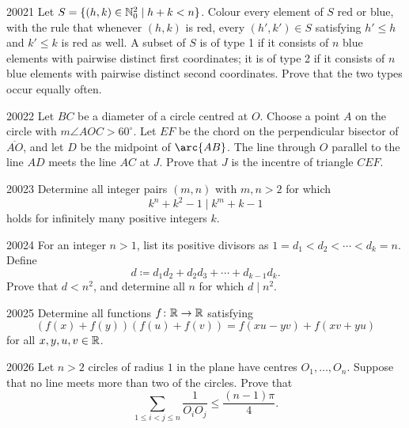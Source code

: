 
\begin{problem}{2002}{1}
Let $S=\{(h, k)\in\mathbb{N}_0^2\mid h+k<n\}$. Colour every element of $S$ red or blue, with the rule that whenever $(h, k)$ is red, every $(h', k')\in S$ satisfying $h'\leq h$ and $k'\leq k$ is red as well. A subset of $S$ is of type 1 if it consists of $n$ blue elements with pairwise distinct first coordinates; it is of type 2 if it consists of $n$ blue elements with pairwise distinct second coordinates. Prove that the two types occur equally often.
\end{problem}

\begin{problem}{2002}{2}
Let $BC$ be a diameter of a circle centred at $O$. Choose a point $A$ on the circle with $m\angle AOC>60^\circ$. Let $EF$ be the chord on the perpendicular bisector of $\overline{AO}$, and let $D$ be the midpoint of $\arc{AB}$. The line through $O$ parallel to the line $AD$ meets the line $AC$ at $J$. Prove that $J$ is the incentre of triangle $CEF$.
\end{problem}

\begin{problem}{2002}{3}
Determine all integer pairs $(m, n)$ with $m, n>2$ for which
\[
    k^n+k^2-1\mid k^m+k-1
\]
holds for infinitely many positive integers $k$.
\end{problem}

\begin{problem}{2002}{4}
For an integer $n>1$, list its positive divisors as $1=d_1<d_2<\cdots<d_k=n$. Define
\[
    d\coloneqq d_1d_2+d_2d_3+\cdots+d_{k-1}d_k.
\]
Prove that $d<n^2$, and determine all $n$ for which $d\mid n^2$.
\end{problem}

\begin{problem}{2002}{5}
Determine all functions $f\colon\mathbb{R}\to\mathbb{R}$ satisfying
\[
    (f(x)+f(y))(f(u)+f(v))=f(xu-yv)+f(xv+yu)
\]
for all $x, y, u, v\in\mathbb{R}$.
\end{problem}

\begin{problem}{2002}{6}
Let $n>2$ circles of radius $1$ in the plane have centres $O_1, \dots, O_n$. Suppose that no line meets more than two of the circles. Prove that
\[
    \sum_{1\leq i<j\leq n}\frac{1}{O_iO_j}\leq\frac{(n-1)\pi}{4}.
\]
\end{problem}
